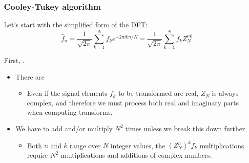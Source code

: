 \documentclass[hyperref={colorlinks=true}]{beamer}
\begin{document}
\begin{frame}%
  \frametitle{Cooley-Tukey algorithm}


  Let's start with the simplified form of the DFT:
  \begin{equation}
    \hat{f}_n = \frac{1}{\sqrt{2\pi}} \sum_{k=1}^{N}  f_k  e^{-2\pi i k n/N} = \frac{1}{\sqrt{2\pi}} \sum_{k=1}^{N}  f_k  Z_{N}^{nk}
  \end{equation}
  
  First, . \pause {}
  
  \pause
  
  \begin{itemize}[<+->]
    \item There are 
    \begin{itemize}
      \item Even if the signal elements $f_k$ to be transformed are real, $Z_{N}$ is always complex, and therefore we must process both real and imaginary parts when computing transforms.
    \end{itemize}
    \item We have to add and/or multiply $N^2$ times unless we break this down further
    \begin{itemize}
      \item Both $n$ and $k$ range over $N$ integer values, the $(Z_{N}^n)^k f_k$ multiplications require $N^2$ multiplications and additions of complex numbers.
    \end{itemize}
  \end{itemize}

\end{frame}

\end{document}
